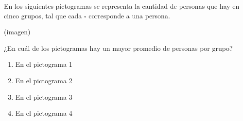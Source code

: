 \begin{problem}
    En los siguientes pictogramas se representa la cantidad de personas que hay en cinco grupos, tal que cada $\square$ corresponde a una persona.

    \begin{center}
    (imagen)
    \end{center}

    ¿En cuál de los pictogramas hay un mayor promedio de personas por grupo?

    \begin{enumerate}[label=\Alph*.]
        \item En el pictograma 1
        \item En el pictograma 2
        \item En el pictograma 3
        \item En el pictograma 4
    \end{enumerate}
\end{problem}
